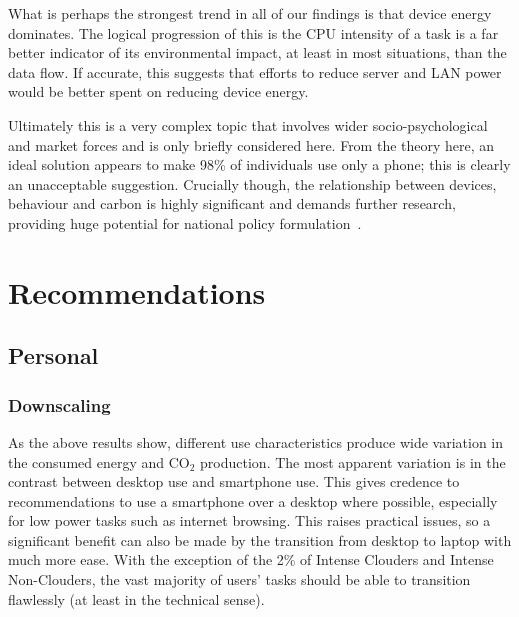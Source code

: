\documentclass[conference]{IEEEtran}
\begin{document}

What is perhaps the strongest trend in all of our findings is that
device energy dominates. The logical progression of this is the CPU
intensity of a task is a far better indicator of its environmental
impact, at least in most situations, than the data flow. If accurate,
this suggests that efforts to reduce server and LAN power would be
better spent on reducing device energy.

Ultimately this is a very complex topic that involves wider
socio-psychological and market forces and is only briefly considered
here. From the theory here, an ideal solution appears to make 98\% of
individuals use only a phone; this is clearly an unacceptable
suggestion. Crucially though, the relationship between devices,
behaviour and carbon is highly significant and demands further
research, providing huge potential for national policy
formulation~\cite{smart2020:2008,ruth:2011}.


\section{Recommendations}

\subsection{Personal}

\subsubsection{Downscaling}

As the above results show, different use characteristics produce wide
variation in the consumed energy and CO$_2$ production. The most
apparent variation is in the contrast between desktop use and
smartphone use. This gives credence to recommendations to use a
smartphone over a desktop where possible, especially for low power
tasks such as internet browsing. This raises practical issues, so a
significant benefit can also be made by the transition from desktop to
laptop with much more ease. With the exception of the 2\% of Intense
Clouders and Intense Non-Clouders, the vast majority of users' tasks
should be able to transition flawlessly (at least in the technical
sense).
\end{document}
